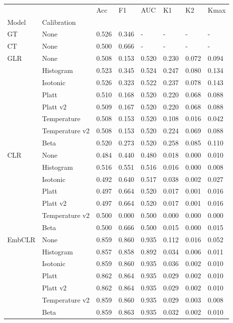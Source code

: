 \begin{tabular}{llllllll}
\toprule
 &  & Acc & F1 & AUC & K1 & K2 & Kmax \\
Model & Calibration &  &  &  &  &  &  \\
\midrule
GT & None & 0.526 & 0.346 & - & - & - & - \\
\cline{1-8}
CT & None & 0.500 & 0.666 & - & - & - & - \\
\cline{1-8}
\multirow[t]{8}{*}{GLR} & None & 0.508 & 0.153 & 0.520 & 0.230 & 0.072 & 0.094 \\
 & Histogram & 0.523 & 0.345 & 0.524 & 0.247 & 0.080 & 0.134 \\
 & Isotonic & 0.526 & 0.323 & 0.522 & 0.237 & 0.078 & 0.143 \\
 & Platt & 0.510 & 0.168 & 0.520 & 0.220 & 0.068 & 0.088 \\
 & Platt v2 & 0.509 & 0.167 & 0.520 & 0.220 & 0.068 & 0.088 \\
 & Temperature & 0.508 & 0.153 & 0.520 & 0.108 & 0.016 & 0.042 \\
 & Temperature v2 & 0.508 & 0.153 & 0.520 & 0.224 & 0.069 & 0.088 \\
 & Beta & 0.520 & 0.273 & 0.520 & 0.258 & 0.085 & 0.110 \\
\cline{1-8}
\multirow[t]{7}{*}{CLR} & None & 0.484 & 0.440 & 0.480 & 0.018 & 0.000 & 0.010 \\
 & Histogram & 0.516 & 0.551 & 0.516 & 0.016 & 0.000 & 0.008 \\
 & Isotonic & 0.492 & 0.640 & 0.517 & 0.038 & 0.002 & 0.027 \\
 & Platt & 0.497 & 0.664 & 0.520 & 0.017 & 0.001 & 0.016 \\
 & Platt v2 & 0.497 & 0.664 & 0.520 & 0.017 & 0.001 & 0.016 \\
 & Temperature v2 & 0.500 & 0.000 & 0.500 & 0.000 & 0.000 & 0.000 \\
 & Beta & 0.500 & 0.666 & 0.500 & 0.015 & 0.000 & 0.015 \\
\cline{1-8}
\multirow[t]{7}{*}{EmbCLR} & None & 0.859 & 0.860 & 0.935 & 0.112 & 0.016 & 0.052 \\
 & Histogram & 0.857 & 0.858 & 0.892 & 0.034 & 0.006 & 0.011 \\
 & Isotonic & 0.859 & 0.860 & 0.935 & 0.036 & 0.002 & 0.010 \\
 & Platt & 0.862 & 0.864 & 0.935 & 0.029 & 0.002 & 0.010 \\
 & Platt v2 & 0.862 & 0.864 & 0.935 & 0.029 & 0.002 & 0.010 \\
 & Temperature v2 & 0.859 & 0.860 & 0.935 & 0.029 & 0.003 & 0.008 \\
 & Beta & 0.859 & 0.863 & 0.935 & 0.032 & 0.002 & 0.010 \\
\cline{1-8}
\bottomrule
\end{tabular}
